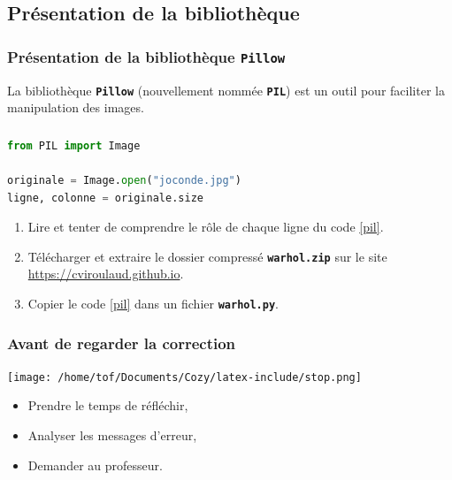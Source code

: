 \documentclass[svgnames,11pt]{beamer}
\begin{document}
\subsection{Présentation de la bibliothèque}
\begin{frame}[fragile]
    \frametitle{Présentation de la bibliothèque \textbf{\texttt{Pillow}}}
    La bibliothèque \texttt{\textbf{Pillow}} (nouvellement nommée \textbf{\texttt{PIL}}) est un outil pour faciliter la manipulation des images.
    
\end{frame}
\begin{frame}[fragile]
    \frametitle{}

    \begin{center}
        \begin{lstlisting}[language=Python , basicstyle=\ttfamily\small, xleftmargin=2em, xrightmargin=2em]
from PIL import Image

originale = Image.open("joconde.jpg")
ligne, colonne = originale.size
\end{lstlisting}
        \label{pil}
    \end{center}
    \begin{activite}
        \begin{enumerate}
            \item Lire et tenter de comprendre le rôle de chaque ligne du code \ref{pil}.
            \item Télécharger et extraire le dossier compressé \textbf{\texttt{warhol.zip}} sur le site \url{https://cviroulaud.github.io}.
            \item Copier le code \ref{pil} dans un fichier \textbf{\texttt{warhol.py}}.
        \end{enumerate}
    \end{activite}

\end{frame}
\begin{frame}
    \frametitle{Avant de regarder la correction}
    \begin{center}
        \centering
        \texttt{[image: /home/tof/Documents/Cozy/latex-include/stop.png]}
    \end{center}
    {\Large
    \begin{itemize}
        \item Prendre le temps de réfléchir,
        \item Analyser les messages d'erreur,
        \item Demander au professeur.
    \end{itemize}
    }
\end{frame}
\end{document}
